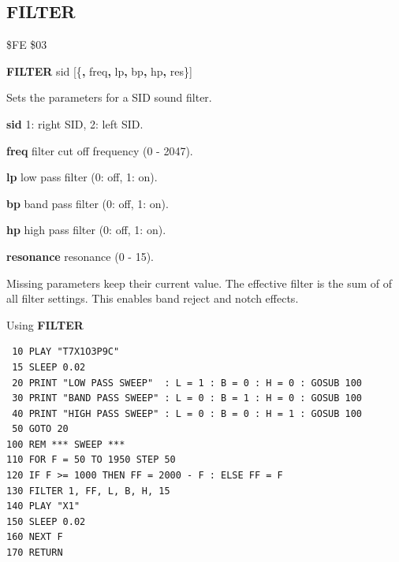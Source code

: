 \subsection{FILTER}
\begin{description}[leftmargin=2cm,style=nextline]
\item [Token:]    \$FE \$03

\item [Format:]   {\bf FILTER} sid [\{{\bf,} freq{\bf,} lp{\bf,} bp{\bf,} hp{\bf,} res\}]

\item [Usage:]    Sets the parameters for a SID sound filter.

                  {\bf sid} 1: right SID, 2: left SID.

                  {\bf freq} filter cut off frequency (0 - 2047).

                  {\bf lp} low pass filter (0: off, 1: on).

                  {\bf bp} band pass filter (0: off, 1: on).

                  {\bf hp} high pass filter (0: off, 1: on).

                  {\bf resonance} resonance (0 - 15).

\item [Remarks:]  Missing parameters keep their current value. The effective filter is the sum of of all filter settings. This enables band reject and notch effects.

\item [Example:]  Using {\bf FILTER}

\begin{tcolorbox}[colback=black,coltext=white]
\verbatimfont{\codefont}
\begin{verbatim}
 10 PLAY "T7X1O3P9C"
 15 SLEEP 0.02
 20 PRINT "LOW PASS SWEEP"  : L = 1 : B = 0 : H = 0 : GOSUB 100
 30 PRINT "BAND PASS SWEEP" : L = 0 : B = 1 : H = 0 : GOSUB 100
 40 PRINT "HIGH PASS SWEEP" : L = 0 : B = 0 : H = 1 : GOSUB 100
 50 GOTO 20
100 REM *** SWEEP ***
110 FOR F = 50 TO 1950 STEP 50
120 IF F >= 1000 THEN FF = 2000 - F : ELSE FF = F
130 FILTER 1, FF, L, B, H, 15
140 PLAY "X1"
150 SLEEP 0.02
160 NEXT F
170 RETURN
\end{verbatim}
\end{tcolorbox}
\end{description}


\newpage
